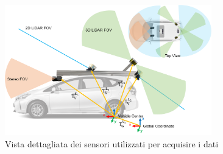 \begin{figure}[H]
    \centering
    \includegraphics[width=0.8\textwidth]{Immagini/system_sideview.png}
    \caption{Vista dettagliata dei sensori utilizzati per acquisire i dati}
    \label{fig:SystemSensors}
\end{figure}
\newpage

